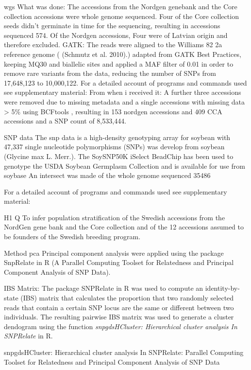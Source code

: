 \documentclass[9pt, onecolumn,twoside]{gsajnl}
\begin{document}
wgs
What was done: The accessions from the Nordgen genebank and the Core collection accessions were whole genome sequenced. Four of the Core collection seeds didn't germinate in time for the sequencing, resulting in accessions sequenced 574. Of the Nordgen accessions, Four were of Latvian origin and therefore excluded. 
GATK: 
The reads were aligned to the Williams 82 2a reference genome ( (Schmutz et al. 2010).) adapted from GATK Best Practices, keeping MQ30 and biallelic sites and applied a MAF filter of 0.01 in order to remove rare variants from the data, reducing the number of SNPs from 17,648,123 to 10,000,122. 
For a detailed account of programs and commands used see supplementary material:  
From when i received it:
A further three accessions were removed due to missing metadata and a single accessions with missing data > 5\% using BCFtools \cite{bcftools}, resulting in 153 nordgen accessions and 409 CCA accessions and a SNP count of 8,533,444. 


SNP data
The snp data is a high-density genotyping array for soybean with 47,337 single nucleotide polymorphisms (SNPs) was develop from soybean (Glycine max L. Merr.). The SoySNP50K iSelect BeadChip has been used to genotype the USDA Soybean Germplasm Collection and is available for use from soybase
 An intersect was made of the whole genome sequenced
35486

For a detailed account of programs and commands used see supplementary material: 

H1
Q 
To infer population stratification of the Swedish accessions from the NordGen gene bank and the Core collection and of the 12 accessions assumed to be founders of the Swedish breeding program.

Method
pca
Principal component analysis were applied using the package SnpRelate in R (A Parallel Computing Toolset for Relatedness and Principal Component Analysis of SNP Data). 


IBS Matrix: The package SNPRelate in R was used to compute an identity-by-state (IBS) matrix that calculates the proportion that two randomly selected reads that contain a certain SNP locus are the same or different between two individuals. The resulting pairwise IBS matrix was used to generate a cluster dendogram using the function \textit{snpgdsHCluster: Hierarchical cluster analysis In SNPRelate }in R. 


 snpgdsHCluster: Hierarchical cluster analysis
In SNPRelate: Parallel Computing Toolset for Relatedness and Principal Component Analysis of SNP Data 
\end{document}
